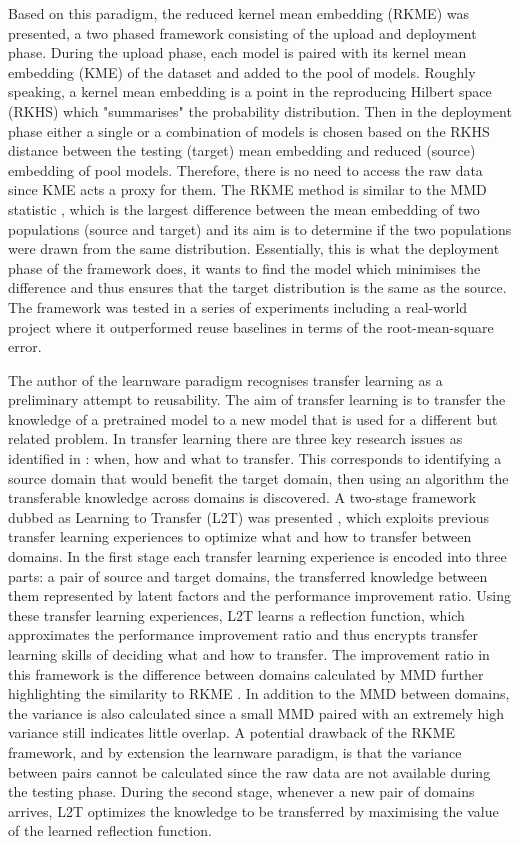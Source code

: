 \documentclass{mprop}
\begin{document}
Based on this paradigm, the reduced kernel mean embedding (RKME) \cite{KernelMMD} was presented, a two phased framework consisting of the upload and deployment phase. During the upload phase, each model is paired with its kernel mean embedding (KME) of the dataset and added to the pool of models. Roughly speaking, a kernel mean embedding is a point in the reproducing Hilbert space (RKHS) which "summarises" the probability distribution. Then in the deployment phase either a single or a combination of models is chosen based on the RKHS distance between the testing (target) mean embedding and reduced (source) embedding of pool models. Therefore, there is no need to access the raw data since KME acts a proxy for them. The RKME method is similar to the MMD  statistic \cite{OriginalMMD}, which is the largest difference between the mean embedding of two populations (source and target) and its aim is to determine if the two populations were drawn from the same distribution. Essentially, this is what the deployment phase of the framework does, it wants to find the model which minimises the difference and thus ensures that the target distribution is the same as the source. The framework was tested in a series of experiments including a real-world project where it outperformed reuse baselines in terms of the root-mean-square error.

The author of the learnware paradigm \cite{Learnware} recognises transfer learning as a preliminary attempt to reusability. The aim of transfer learning is to transfer the knowledge of a pretrained model to a new model that is used for a different but related problem. In transfer learning there are three key research issues as identified in \cite{DefinitionTL}: when, how and what to transfer. This corresponds to identifying a source domain that would benefit the target domain, then using an algorithm the transferable knowledge across domains is discovered. A two-stage framework dubbed as Learning to Transfer (L2T) was presented \cite{L2T}, which exploits previous transfer learning experiences to optimize what and how to transfer between domains. In the first stage each transfer learning experience is encoded into three parts: a pair of source and target domains, the transferred knowledge between them represented by latent factors and the performance improvement ratio. Using these transfer learning experiences, L2T learns a reflection function, which approximates the performance improvement ratio and thus encrypts transfer learning skills of deciding what and how to transfer. The improvement ratio in this framework is the difference between domains calculated by MMD further highlighting the similarity to RKME \cite{KernelMMD}. In addition to the MMD between domains, the variance is also calculated since a small MMD paired with an extremely high variance still indicates little overlap. A potential drawback of the RKME \cite{KernelMMD} framework, and by extension the learnware paradigm, is that the variance between pairs cannot be calculated since the raw data are not available during the testing phase. During the second stage, whenever a new pair of domains arrives, L2T optimizes the knowledge to be transferred by maximising the value of the learned reflection function.
\end{document}
